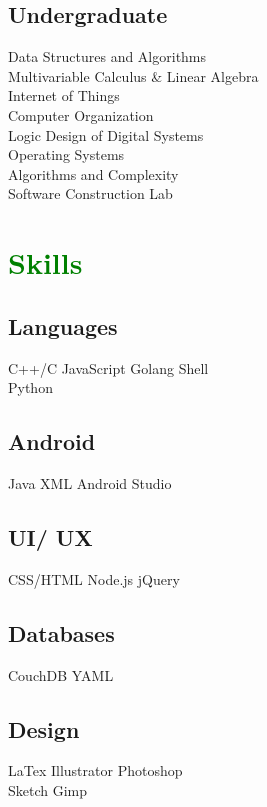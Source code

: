 \documentclass[letterpaper]{deedy-resume-openfont} %
\begin{document}
\begin{minipage}[t]{0.33\textwidth}
\subsection{Undergraduate}

Data Structures and Algorithms \\
Multivariable Calculus \& Linear Algebra\\
Internet of Things\\
Computer Organization\\
Logic Design of Digital Systems\\
Operating Systems\\
Algorithms and Complexity\\
Software Construction Lab\\

\sectionsep %


\section{\textcolor{GREEN}{Skills}}
\subsection{Languages}
C++/C \textbullet{} JavaScript \textbullet{} Golang \textbullet{} Shell \textbullet{} \\
Python \\
\sectionsep
\subsection{Android}
Java \textbullet{} XML \textbullet{} Android Studio \\
\sectionsep
\subsection{UI/ UX}
CSS/HTML \textbullet{} Node.js \textbullet{} jQuery \\
\sectionsep
\subsection{Databases}
CouchDB \textbullet{} YAML
\sectionsep %
\subsection{Design}
LaTex \textbullet{} Illustrator \textbullet{} Photoshop \textbullet{}\\
Sketch \textbullet{} Gimp\\


\end{minipage}
\end{document}
